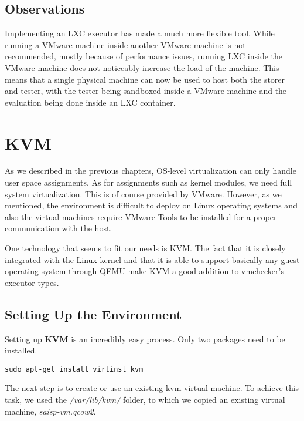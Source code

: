 \subsection{Observations}
\label{sec:vmc-lxc-comments}

Implementing an LXC executor has made \project a much more flexible tool.
While running a VMware machine inside another VMware machine is not recommended,
mostly because of performance issues, running LXC inside the VMware machine
does not noticeably increase the load of the machine. This means that a single
physical machine can now be used to host both the storer and tester, with the
tester being sandboxed inside a VMware machine and the evaluation being done
inside an LXC container.

\section{KVM}
\label{sec:vmc-kvm}

As we described in the previous chapters, OS-level virtualization can only
handle user space assignments. As for assignments such as kernel modules,
we need full system virtualization. This is of course provided by VMware.
However, as we mentioned, the environment is difficult to deploy on 
Linux operating systems and also the virtual machines require VMware Tools
to be installed for a proper communication with the host.

One technology that seems to fit our needs is KVM. The fact that it is closely
integrated with the Linux kernel and that it is able to support basically
any guest operating system through QEMU make KVM a good addition to vmchecker's 
executor types.

\subsection{Setting Up the Environment}
\label{sub-sec:vmc-kvm-setup}

Setting up \textbf{KVM} is an incredibly easy process. Only two packages need
to be installed.

\lstset{caption=Install the Needed Packages, label=lst:kvm-deps}
\begin{lstlisting}
sudo apt-get install virtinst kvm
\end{lstlisting}

The next step is to create or use an existing kvm virtual machine.
To achieve this task, we used the \textit{/var/lib/kvm/} folder, to which
we copied an existing virtual machine, \textit{saisp-vm.qcow2}.

